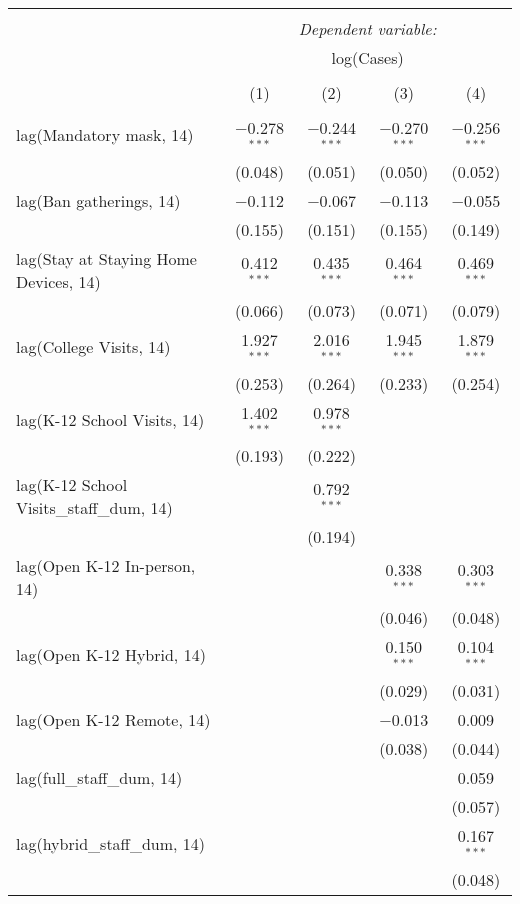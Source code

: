 \begin{tabular}{@{\extracolsep{1pt}}lcccc} 
\\[-1.8ex]\hline 
\hline \\[-1.8ex] 
 & \multicolumn{4}{c}{\textit{Dependent variable:}} \\ 
\cline{2-5} 
 & \multicolumn{4}{c}{log(Cases)} \\ 
\\[-1.8ex] & (1) & (2) & (3) & (4)\\ 
\hline \\[-1.8ex] 
 lag(Mandatory mask, 14) & $-$0.278$^{***}$ & $-$0.244$^{***}$ & $-$0.270$^{***}$ & $-$0.256$^{***}$ \\ 
  & (0.048) & (0.051) & (0.050) & (0.052) \\ 
  lag(Ban gatherings, 14) & $-$0.112 & $-$0.067 & $-$0.113 & $-$0.055 \\ 
  & (0.155) & (0.151) & (0.155) & (0.149) \\ 
  lag(Stay at Staying Home Devices, 14) & 0.412$^{***}$ & 0.435$^{***}$ & 0.464$^{***}$ & 0.469$^{***}$ \\ 
  & (0.066) & (0.073) & (0.071) & (0.079) \\ 
  lag(College Visits, 14) & 1.927$^{***}$ & 2.016$^{***}$ & 1.945$^{***}$ & 1.879$^{***}$ \\ 
  & (0.253) & (0.264) & (0.233) & (0.254) \\ 
  lag(K-12 School Visits, 14) & 1.402$^{***}$ & 0.978$^{***}$ &  &  \\ 
  & (0.193) & (0.222) &  &  \\ 
  lag(K-12 School Visits\_staff\_dum, 14) &  & 0.792$^{***}$ &  &  \\ 
  &  & (0.194) &  &  \\ 
  lag(Open K-12 In-person, 14) &  &  & 0.338$^{***}$ & 0.303$^{***}$ \\ 
  &  &  & (0.046) & (0.048) \\ 
  lag(Open K-12 Hybrid, 14) &  &  & 0.150$^{***}$ & 0.104$^{***}$ \\ 
  &  &  & (0.029) & (0.031) \\ 
  lag(Open K-12 Remote, 14) &  &  & $-$0.013 & 0.009 \\ 
  &  &  & (0.038) & (0.044) \\ 
  lag(full\_staff\_dum, 14) &  &  &  & 0.059 \\ 
  &  &  &  & (0.057) \\ 
  lag(hybrid\_staff\_dum, 14) &  &  &  & 0.167$^{***}$ \\ 
  &  &  &  & (0.048) \\ 

\end{tabular}
